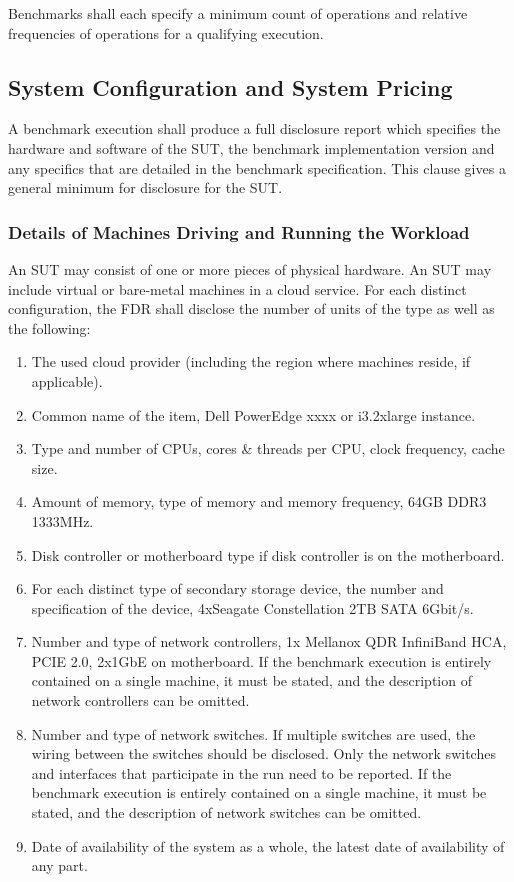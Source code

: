 Benchmarks shall each specify a minimum count of operations and relative frequencies of operations for a qualifying
execution.

\subsection{System Configuration and System Pricing}
\label{sec:system-config}


A benchmark execution shall produce a full disclosure report which specifies the hardware and software of the SUT, the benchmark implementation version and any specifics that are detailed in the benchmark specification. This clause gives a general minimum for disclosure for the SUT.

\subsubsection{Details of Machines Driving and Running the Workload}
An SUT may consist of one or more pieces of physical hardware. An SUT may include virtual or bare-metal machines in a cloud service.
For each distinct configuration, the FDR shall disclose the number of units of the type as well as the following:

\begin{enumerate}
    \item The used cloud provider (including the region where machines reside, if applicable).
    \item Common name of the item, \eg Dell PowerEdge xxxx or i3.2xlarge instance.
    \item Type and number of CPUs, cores \& threads per CPU, clock frequency, cache size.
    \item Amount of memory, type of memory and memory frequency, \eg 64GB DDR3 1333MHz.
    \item Disk controller or motherboard type if disk controller is on the motherboard.
    \item For each distinct type of secondary storage device, the number and specification of the device, \eg 4xSeagate Constellation 2TB SATA 6Gbit/s.
    \item Number and type of network controllers, \eg 1x Mellanox QDR InfiniBand HCA, PCIE 2.0, 2x1GbE on motherboard. If the benchmark execution is entirely contained on a single machine, it must be stated, and the description of network controllers can be omitted.
    \item Number and type of network switches. If multiple switches are used, the wiring between the switches should be disclosed.
    Only the network switches and interfaces that participate in the run need to be reported. If the benchmark execution is entirely contained on a single machine, it must be stated, and the description of network switches can be omitted.
    \item Date of availability of the system as a whole, \ie the latest date of availability of any part.
\end{enumerate}


